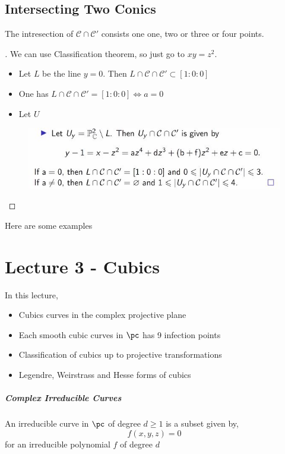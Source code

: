 \documentclass{article}
\begin{document}
\subsection{Intersecting Two Conics}

\begin{nthm}[]
  The intresection of $\mathcal{C} \cap \mathcal{C}'$ consists one one, two or three or four points.
\end{nthm}

\begin{proof}[]
  We can use Classification theorem, so just go to $xy = z^2$.
  \begin{itemize}
    \item Let $L$ be the line $y = 0$. Then $L \cap \mathcal{C} \cap \mathcal{C}' \subset [1 : 0 : 0]$
    \item One has $L \cap \mathcal{C} \cap \mathcal{C}' = [1 : 0 : 0] \iff a = 0 $
    \item Let $U$
  \end{itemize}
  \begin{figure}[!ht]
  \centering
  \includegraphics{./figures/L2.4}
  \caption{}
  \end{figure}
\end{proof}

Here are some examples

\section{Lecture 3 - Cubics}
In this lecture,
\begin{itemize}
  \item Cubics curves in the complex projective plane
  \item Each smooth cubic curves in $\pc$ has 9 infection points
  \item Classification of cubics up to projective transformations
  \item Legendre, Weirstrass and Hesse forms of cubics
\end{itemize}

\subparagraph{Complex Irreducible Curves}

\begin{ndefi}[]
  An irreducible  curve in $\pc$ of degree $d \ge 1$ is a subset given by,
  $$ f(x, y, z) = 0 $$
  for an irreducible polynomial $f$ of degree $d$
\end{ndefi}
\end{document}
